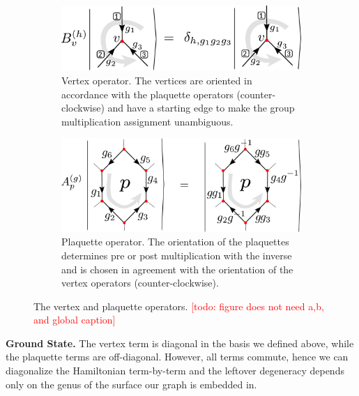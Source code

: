 \documentclass[two column]{article}
\newcommand{\caro}[1]{\textcolor{red}{[#1]}}
\begin{document}
\begin{figure}
    \centering
    \begin{subfigure}[b]{0.45\textwidth}
        \centering
        \includegraphics[width= \linewidth]{Figures/B_ops.pdf}
        \caption{Vertex operator. The vertices are oriented in accordance with the plaquette operators (counter-clockwise) and have a starting edge to make the group multiplication assignment unambiguous.}
        \label{eqn:Bs_def}
    \end{subfigure}\hfill
    \begin{subfigure}[b]{0.45\textwidth}
        \centering
        \includegraphics[width = \linewidth]{Figures/A_ops.pdf}
        \caption{Plaquette operator. The orientation of the plaquettes determines pre or post multiplication with the inverse and is chosen in agreement with the orientation of the vertex operators (counter-clockwise).}
        \label{eqn:As_def}
    \end{subfigure}\hfill
    \caption{The vertex and plaquette operators. \caro{todo: figure does not need a,b, and global caption}}
    \label{fig:vertex_ops}
\end{figure}



\textbf{Ground State.} The vertex term is diagonal in the basis we defined above, while the plaquette terms are off-diagonal.
However, all terms commute, hence we can diagonalize the Hamiltonian term-by-term and the leftover degeneracy depends only on the genus of the surface our graph is embedded in\cite{Kitaev_2003, cui2018topological}.

\end{document}
